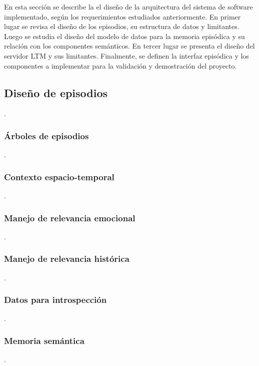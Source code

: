  En esta sección se describe la el diseño de la arquitectura del sistema de software implementado, según los requerimientos estudiados anteriormente. En primer lugar se revisa el diseño de los episodios, su estructura de datos y limitantes. Luego se estudia el diseño del modelo de datos para la memoria episódica y su relación con los componentes semánticos. En tercer lugar se presenta el diseño del servidor LTM y sus limitantes. Finalmente, se definen la interfaz episódica y los componentes a implementar para la validación y demostración del proyecto.
 
 
\subsection{Diseño de episodios}
 .
 
\subsubsection{Árboles de episodios}
 .
 
\subsubsection{Contexto espacio-temporal}
 .

\subsubsection{Manejo de relevancia emocional}
 .

\subsubsection{Manejo de relevancia histórica}
 .

\subsubsection{Datos para introspección}
 .

\subsubsection{Memoria semántica}
 .

